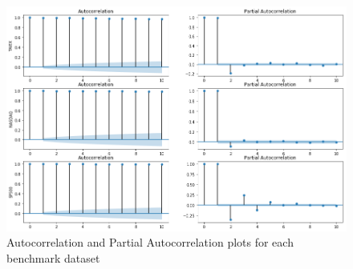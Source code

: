\begin{figure}
    \centering
    \includegraphics[width=\textwidth]{figures/datasets_acf.png}
    \caption{Autocorrelation and Partial Autocorrelation plots for each benchmark dataset}
    \label{fig:datasets_acf}
\end{figure}

